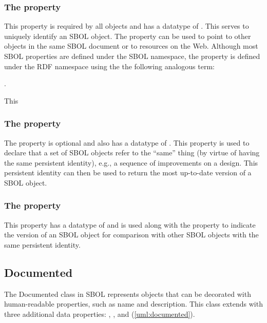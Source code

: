 \subsubsection*{The  property}
\label{sec:identity}
This property is required by all  objects and has a datatype of . This  serves to uniquely identify an SBOL object. The  property can be used to point to other objects in the same SBOL document or to resources on the Web. Although most SBOL properties are defined under the SBOL namespace, the  property is defined under the RDF namespace using the the following analogous term:

.

This 


\subsubsection*{The  property}
\label{sec:persistentIdentity}
The  property is optional and also has a datatype of . This property is used to declare that a set of SBOL objects refer to the ``same'' thing (by virtue of having the same persistent identity), e.g., a sequence of improvements on a design. This persistent identity can then be used to return the most up-to-date version of a SBOL object.



\subsubsection*{The  property}
\label{sec:version}
This property has a datatype of  and is used along with the  property to indicate the version of an SBOL object for comparison with other SBOL objects with the same persistent identity.

\subsection {Documented}
\label{sec:Documented}
The Documented class in SBOL represents objects that can be decorated with human-readable properties, such as name and description. This class extends  with three additional data properties: , , and  (\ref{uml:documented}). 

